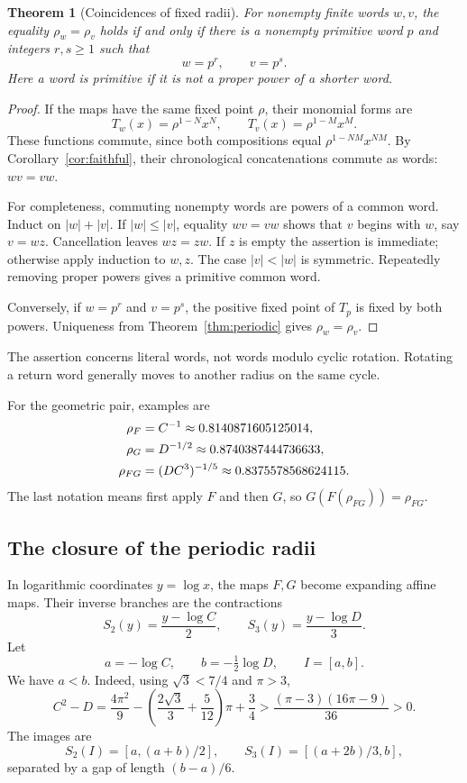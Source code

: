 \documentclass[11pt,a4paper]{article}
\numberwithin{equation}{section}
\newtheorem{theorem}{Theorem}[section]
\theoremstyle{definition}
\theoremstyle{remark}
\begin{document}
\begin{theorem}[Coincidences of fixed radii]\label{thm:primitive}
For nonempty finite words $w,v$, the equality $\rho_w=\rho_v$ holds if and only if there is a nonempty primitive word $p$ and integers $r,s\geq1$ such that
\[
 w=p^r,\qquad v=p^s.
\]
Here a word is primitive if it is not a proper power of a shorter word.
\end{theorem}
\begin{proof}
If the maps have the same fixed point $\rho$, their monomial forms are
\[
 T_w(x)=\rho^{1-N}x^N,\qquad
 T_v(x)=\rho^{1-M}x^M.
\]
These functions commute, since both compositions equal $\rho^{1-NM}x^{NM}$. By Corollary~\ref{cor:faithful}, their chronological concatenations commute as words: $wv=vw$.

For completeness, commuting nonempty words are powers of a common word. Induct on $|w|+|v|$. If $|w|\leq|v|$, equality $wv=vw$ shows that $v$ begins with $w$, say $v=wz$. Cancellation leaves $wz=zw$. If $z$ is empty the assertion is immediate; otherwise apply induction to $w,z$. The case $|v|<|w|$ is symmetric. Repeatedly removing proper powers gives a primitive common word.

Conversely, if $w=p^r$ and $v=p^s$, the positive fixed point of $T_p$ is fixed by both powers. Uniqueness from Theorem~\ref{thm:periodic} gives $\rho_w=\rho_v$.
\end{proof}

The assertion concerns literal words, not words modulo cyclic rotation. Rotating a return word generally moves to another radius on the same cycle.

For the geometric pair, examples are
\begin{align}
 \rho_F&=C^{-1}\approx0.8140871605125014,\notag\\
 \rho_G&=D^{-1/2}\approx0.8740387444736633,\notag\\
 \rho_{FG}&=(DC^3)^{-1/5}\approx0.8375578568624115.\label{eq:rho-values}
\end{align}
The last notation means first apply $F$ and then $G$, so $G(F(\rho_{FG}))=\rho_{FG}$.

\subsection{The closure of the periodic radii}

In logarithmic coordinates $y=\log x$, the maps $F,G$ become expanding affine maps. Their inverse branches are the contractions
\begin{equation}\label{eq:IFS}
 S_2(y)=\frac{y-\log C}{2},\qquad
 S_3(y)=\frac{y-\log D}{3}.
\end{equation}
Let
\begin{equation}\label{eq:interval}
 a=-\log C,\qquad b=-\tfrac12\log D,\qquad I=[a,b].
\end{equation}
We have $a<b$. Indeed, using $\sqrt3<7/4$ and $\pi>3$,
\[
 C^2-D
 =\frac{4\pi^2}{9}-\left(\frac{2\sqrt3}{3}+\frac5{12}\right)\pi+\frac34
 >\frac{(\pi-3)(16\pi-9)}{36}>0.
\]
The images are
\begin{equation}\label{eq:separation}
 S_2(I)=[a,(a+b)/2],\qquad
 S_3(I)=[(a+2b)/3,b],
\end{equation}
separated by a gap of length $(b-a)/6$.
\end{document}
